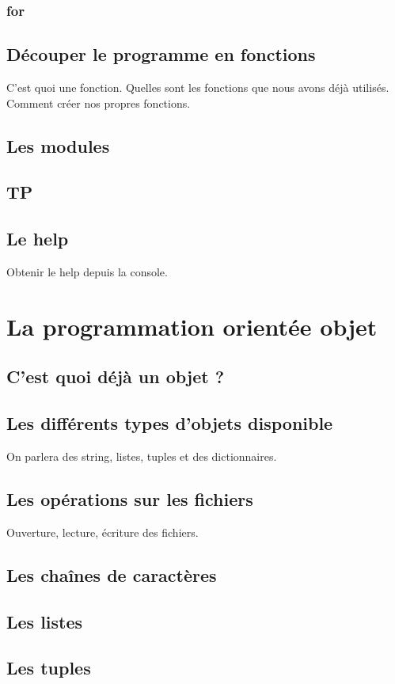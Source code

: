 \documentclass[12pt]{article}
\begin{document}
        \subsubsection{for}
    \subsection{Découper le programme en fonctions}
        C'est quoi une fonction. Quelles sont les fonctions que nous avons déjà utilisés. Comment créer nos propres
        fonctions.
    \subsection{Les modules}
    \subsection{TP}
    \subsection{Le help}
        Obtenir le help depuis la console.

\section{La programmation orientée objet}
    \subsection{C'est quoi déjà un objet ?}
    \subsection{Les différents types d'objets disponible}
        On parlera des string, listes, tuples et des dictionnaires.
    \subsection{Les opérations sur les fichiers}
        Ouverture, lecture, écriture des fichiers.
    \subsection{Les chaînes de caractères}
    \subsection{Les listes}
    \subsection{Les tuples}
\end{document}
